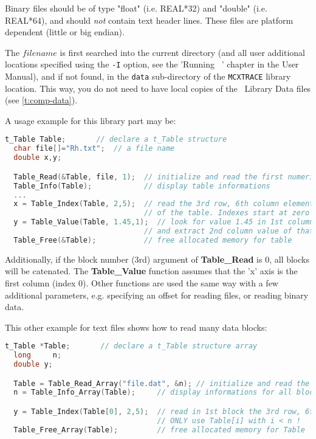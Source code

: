 Binary files should be of type "float" (i.e. REAL*32) and "double" (i.e. REAL*64),
and should \emph{not} contain text header lines. These files are platform
dependent (little or big endian).

The $filename$ is first searched into the current directory (and all user additional locations specified using the \verb+-I+ option, see the 'Running \MCX\ ' chapter in the User Manual), and if not found, in the \verb+data+ sub-directory of the \verb+MCXTRACE+ library location. 
 This way, you do not need to have local copies of the \MCX\ Library Data files (see \cref{t:comp-data}).

A usage example for this library part may be:
\begin{lstlisting}[language=C]
  t_Table Table;       // declare a t_Table structure
  char file[]="Rh.txt";  // a file name
  double x,y;

  Table_Read(&Table, file, 1);  // initialize and read the first numerical block
  Table_Info(Table);            // display table informations
  ...
  x = Table_Index(Table, 2,5);  // read the 3rd row, 6th column element
                                // of the table. Indexes start at zero in C.
  y = Table_Value(Table, 1.45,1);  // look for value 1.45 in 1st column (x axis)
                                // and extract 2nd column value of that row
  Table_Free(&Table);           // free allocated memory for table
\end{lstlisting}
Additionally, if the block number (3rd) argument of  {\bfseries Table\_Read} is 0, all blocks will be catenated.
The {\bfseries Table\_Value} function assumes that the 'x' axis is the first column (index 0).
Other functions are used the same way with a few additional parameters, e.g. specifying an offset for reading files, or reading binary data.

This other example for text files shows how to read many data blocks:
\begin{lstlisting}[language=C]
  t_Table *Table;       // declare a t_Table structure array
  long     n;
  double y;

  Table = Table_Read_Array("file.dat", &n); // initialize and read the all numerical block
  n = Table_Info_Array(Table);     // display informations for all blocks (also returns n)

  y = Table_Index(Table[0], 2,5);  // read in 1st block the 3rd row, 6th column element
                                   // ONLY use Table[i] with i < n !
  Table_Free_Array(Table);         // free allocated memory for Table
\end{lstlisting}

